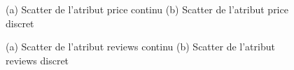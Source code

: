 
\begin{figure}[H]
	\centering
	 \caption{(a) Scatter de l'atribut price continu (b) Scatter de l'atribut price discret}
	\label{fig:price}
\end{figure}
\begin{figure}[H]
	\centering
	\caption{(a) Scatter de l'atribut reviews continu (b) Scatter de l'atribut reviews discret}
	\label{fig:reviews}
\end{figure}
